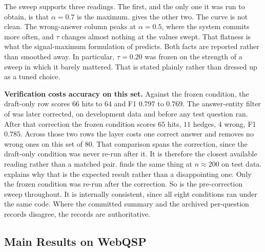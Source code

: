 The sweep supports three readings. The first, and the only one it was run to
obtain, is that $\alpha = 0.7$ is the maximum.  gives the other
two. The curve is not clean. The wrong-answer column peaks at $\alpha = 0.5$,
where the system commits more often, and $\tau$ changes almost nothing at the
values swept. That flatness is what the signal-maximum formulation of
 predicts. Both facts are reported rather than smoothed
away. In particular, $\tau = 0.20$ was frozen on the strength of a sweep in
which it barely mattered. That is stated plainly rather than dressed up as a
tuned choice.

\textbf{Verification costs accuracy on this set.} Against the frozen condition,
the draft-only row scores $66$ hits to $64$ and F1 $0.797$ to $0.769$. The
answer-entity filter of  was later corrected, on
development data and before any test question ran. After that correction the
frozen condition scores $65$ hits, $11$ hedges, $4$ wrong, F1 $0.785$. Across
those two rows the layer costs one correct answer and removes no wrong ones on
this set of $80$. That comparison spans the correction, since the draft-only
condition was never re-run after it. It is therefore the closest available
reading rather than a matched pair.  finds the same thing at
$n \approx 200$ on test data.  explains why that is the
expected result rather than a disappointing one. Only the frozen condition was
re-run after the correction. So  is the pre-correction sweep
throughout. It is internally consistent, since all eight conditions ran under
the same code. Where the committed summary and the archived per-question records
disagree, the records are authoritative.

\subsection{Main Results on WebQSP}\label{sec:webqsp-results}

